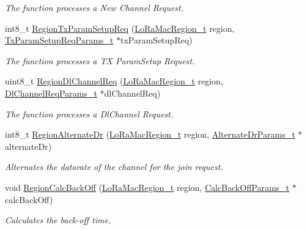\begin{DoxyCompactItemize}
\begin{DoxyCompactList}\small\item\em The function processes a New Channel Request. \end{DoxyCompactList}\item 
int8\+\_\+t \hyperlink{group__REGION_ga50dbaca7bf982330c183614302d525c4}{Region\+Tx\+Param\+Setup\+Req} (\hyperlink{group__LORAMAC_ga80c48efda9ae02e14b58160d34a798dd}{Lo\+Ra\+Mac\+Region\+\_\+t} region, \hyperlink{group__REGION_ga26836ef2996e70410e42ef471073f855}{Tx\+Param\+Setup\+Req\+Params\+\_\+t} $\ast$tx\+Param\+Setup\+Req)
\begin{DoxyCompactList}\small\item\em The function processes a TX Param\+Setup Request. \end{DoxyCompactList}\item 
uint8\+\_\+t \hyperlink{group__REGION_ga54f7c22677b2d0628e9914f53501d4b8}{Region\+Dl\+Channel\+Req} (\hyperlink{group__LORAMAC_ga80c48efda9ae02e14b58160d34a798dd}{Lo\+Ra\+Mac\+Region\+\_\+t} region, \hyperlink{group__REGION_gae0d608ff1f8ea0a430e4f9a4c38ec7f3}{Dl\+Channel\+Req\+Params\+\_\+t} $\ast$dl\+Channel\+Req)
\begin{DoxyCompactList}\small\item\em The function processes a Dl\+Channel Request. \end{DoxyCompactList}\item 
int8\+\_\+t \hyperlink{group__REGION_ga4177d2eac64338ef073b43efa508e12a}{Region\+Alternate\+Dr} (\hyperlink{group__LORAMAC_ga80c48efda9ae02e14b58160d34a798dd}{Lo\+Ra\+Mac\+Region\+\_\+t} region, \hyperlink{group__REGION_ga001ea4338d1c83f4c785b49d7ad2d696}{Alternate\+Dr\+Params\+\_\+t} $\ast$alternate\+Dr)
\begin{DoxyCompactList}\small\item\em Alternates the datarate of the channel for the join request. \end{DoxyCompactList}\item 
void \hyperlink{group__REGION_ga07cfd135a3e8f85e15a5424c07f71d67}{Region\+Calc\+Back\+Off} (\hyperlink{group__LORAMAC_ga80c48efda9ae02e14b58160d34a798dd}{Lo\+Ra\+Mac\+Region\+\_\+t} region, \hyperlink{group__REGION_ga7c5c9a8da174e6679eded8257dc92fd9}{Calc\+Back\+Off\+Params\+\_\+t} $\ast$calc\+Back\+Off)
\begin{DoxyCompactList}\small\item\em Calculates the back-\/off time. \end{DoxyCompactList}\item 

\end{DoxyCompactItemize}
